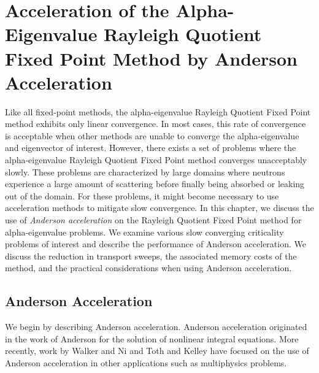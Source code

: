 \chapter[Acceleration of the Alpha-Eigenvalue Rayleigh Quotient Fixed Point Method by Anderson Acceleration][Anderson Acceleration]{Acceleration of the Alpha-Eigenvalue Rayleigh Quotient Fixed Point Method by Anderson Acceleration}
\label{sec:AndAcc}

Like all fixed-point methods, the alpha-eigenvalue Rayleigh Quotient Fixed Point method exhibits only linear convergence. In most cases, this rate of convergence is acceptable when other methods are unable to converge the alpha-eigenvalue and eigenvector of interest. However, there exists a set of problems where the alpha-eigenvalue Rayleigh Quotient Fixed Point method converges unacceptably slowly. These problems are characterized by large domains where neutrons experience a large amount of scattering before finally being absorbed or leaking out of the domain. For these problems, it might become necessary to use acceleration methods to mitigate slow convergence. In this chapter, we discuss the use of \textit{Anderson acceleration} on the Rayleigh Quotient Fixed Point method for alpha-eigenvalue problems. We examine various slow converging criticality problems of interest and describe the performance of Anderson acceleration. We discuss the reduction in transport sweeps, the associated memory costs of the method, and the practical considerations when using Anderson acceleration.

\section{Anderson Acceleration}

We begin by describing Anderson acceleration. Anderson acceleration originated in the work of Anderson \cite{anderson1965iterative} for the solution of nonlinear integral equations. More recently, work by Walker and Ni \cite{walker_anderson_2011} and Toth and Kelley \cite{toth_convergence_2015} have focused on the use of Anderson acceleration in other applications such as multiphysics problems. 

